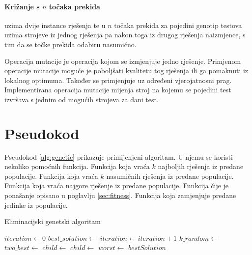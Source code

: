 \documentclass[utf8, seminar, numeric]{fer}
\begin{document}
\paragraph{Križanje s $n$ točaka prekida} uzima dvije instance rješenja te u $n$ točaka prekida za pojedini genotip testova uzima strojeve iz jednog rješenja pa nakon toga iz drugog rješenja naizmjence, s tim da se točke prekida odabiru nasumično.

Operacija mutacije je operacija kojom se izmjenjuje jedno rješenje. Primjenom operacije mutacije moguće je poboljšati kvalitetu tog rješenja ili ga pomaknuti iz lokalnog optimuma. Također se primjenjuje uz određeni vjerojatnosni prag. Implementirana operacija mutacije mijenja stroj na kojemu se pojedini test izvršava s jednim od mogućih strojeva za dani test.

\section{Pseudokod}

Pseudokod \ref{alg:genetic} prikazuje primijenjeni algoritam. U njemu se koristi nekoliko pomoćnih funkcija. Funkcija  koja vraća $k$ najboljih rješenja iz predane populacije. Funkcija  koja vraća $k$ nasumičnih rješenja iz predane populacije. Funkcija   koja vraća najgore rješenje iz predane populacije. Funkcija  čije je ponašanje opisano u poglavlju \ref{sec:fitness}. Funkcija  koja zamjenjuje predane jedinke iz populacije.

\begin{algorithm}[H]
	\caption{Eliminacijski genetski algoritam}
	\begin{algorithmic}[1]
		    \State $iteration \gets 0$
		    \State $best\_solution \gets$ 
		            \State $iteration \gets iteration + 1$
		            \State $k\_random \gets$ 
		            \State $two\_best \gets$ 
		            \State $child \gets$ 
		            \State $child \gets$ 
		            \State $worst \gets$ 
		             \State{}
		            \EndIf
		        \EndWhile \State{}
		\Return $bestSolution$
		\EndFunction
	\end{algorithmic}
	\label{alg:genetic}
\end{algorithm}
\end{document}
